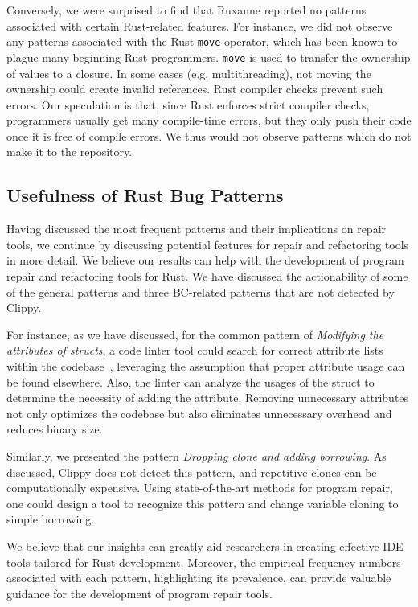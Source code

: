 Conversely, we were surprised to find that Ruxanne reported no patterns associated with certain Rust-related features. For instance, we did not observe any patterns associated with the Rust \verb+move+ operator, which has been known to plague many beginning Rust programmers. \verb+move+ is used to transfer the ownership of values to a closure. In some cases (e.g. multithreading), not moving the ownership could create invalid references. Rust compiler checks prevent such errors. Our speculation is that, since Rust enforces strict compiler checks, programmers usually get many compile-time errors, but they only push their code once it is free of compile errors. We thus would not observe patterns which do not make it to the repository.

\subsection{Usefulness of Rust Bug Patterns}

Having discussed the most frequent patterns and their implications on repair tools, we continue by discussing potential features for repair and refactoring tools in more detail. We believe our results can help with the development of program repair and refactoring tools for Rust. We have discussed the actionability of some of the general patterns and three BC-related patterns that are not detected by Clippy.

For instance, as we have discussed, for the common pattern of \textit{Modifying the attributes of structs}, a code linter tool could search for correct attribute lists within the codebase~\citep{forrest2009genetic}, leveraging the assumption that proper attribute usage can be found elsewhere. Also, the linter can analyze the usages of the struct to determine the necessity of adding the attribute. Removing unnecessary attributes not only optimizes the codebase but also eliminates unnecessary overhead and reduces binary size.

Similarly, we presented the pattern \textit{Dropping clone and adding borrowing}. As discussed, Clippy does not detect this pattern, and repetitive clones can be computationally expensive. Using state-of-the-art methods for program repair, one could design a tool to recognize this pattern and change variable cloning to simple borrowing.

We believe that our insights can greatly aid researchers in creating effective IDE tools tailored for Rust development. Moreover, the empirical frequency numbers associated with each pattern, highlighting its prevalence, can provide valuable guidance for the development of program repair tools.

